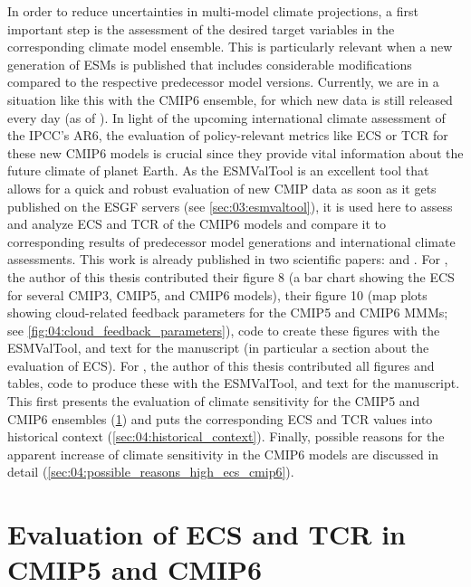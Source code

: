 In order to reduce uncertainties in multi-model climate projections, a first
important step is the assessment of the desired target variables in the
corresponding climate model ensemble. This is particularly relevant when a new
generation of \acp{ESM} is published that includes considerable modifications
compared to the respective predecessor model versions. Currently, we are in a
situation like this with the \acs{CMIP}6 ensemble, for which new data is still
released every day (as of \TheMonth{}). In light of the upcoming international
climate assessment of the \ac{IPCC}'s \acs{AR}6, the evaluation of
policy-relevant metrics like \ac{ECS} or \ac{TCR} for these new \acs{CMIP}6
models is crucial since they provide vital information about the future climate
of planet Earth. As the \ac{ESMValTool} is an excellent tool that allows for a
quick and robust evaluation of new \ac{CMIP} data as soon as it gets published
on the \ac{ESGF} servers (see \cref{sec:03:esmvaltool}), it is used here to
assess and analyze \ac{ECS} and \ac{TCR} of the \acs{CMIP}6 models and compare
it to corresponding results of predecessor model generations and international
climate assessments. This work is already published in two scientific papers:
\textcite{Bock2020} and \textcite{Meehl2020}. For \textcite{Bock2020}, the
author of this thesis contributed their figure 8 (a bar chart showing the
\ac{ECS} for several \acs{CMIP}3, \acs{CMIP}5, and \acs{CMIP}6 models), their
figure 10 (map plots showing cloud-related feedback parameters for the
\acs{CMIP}5 and \acs{CMIP}6 \acp{MMM}; see
\cref{fig:04:cloud_feedback_parameters}), code to create these figures with the
\ac{ESMValTool}, and text for the manuscript (in particular a section about the
evaluation of \ac{ECS}). For \textcite{Meehl2020}, the author of this thesis
contributed all figures and tables, code to produce these with the
\ac{ESMValTool}, and text for the manuscript. This
 first presents the evaluation of
climate sensitivity for the \acs{CMIP}5 and \acs{CMIP}6 ensembles
(\cref{sec:04:evaluation_ecs_and_tcr}) and puts the corresponding \ac{ECS} and
\ac{TCR} values into historical context (\cref{sec:04:historical_context}).
Finally, possible reasons for the apparent increase of climate sensitivity in
the \acs{CMIP}6 models are discussed in detail
(\cref{sec:04:possible_reasons_high_ecs_cmip6}).


\section{Evaluation of \acs{ECS} and \acs{TCR} in \acs{CMIP}5 and \acs{CMIP}6}
\label{sec:04:evaluation_ecs_and_tcr}

